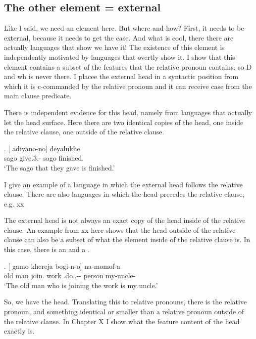 \subsection{The other element = external}\label{sec:external-element}

Like I said, we need an element here. But where and how? First, it needs to be external, because it needs to get the case. And what is cool, there there are actually languages that show we have it!
The existence of this element is independently motivated by languages that overtly show it.
I show that this element contains a subset of the features that the relative pronoun contains, so D and wh is never there.
I placee the external head in a syntactic position from which it is c-commanded by the relative pronoun and it can receive case from the main clause predicate.


There is independent evidence for this head, namely from languages that actually let the head surface. Here there are two identical copies of the head, one inside the relative clause, one outside of the relative clause.

\exg. [ adiyano-no]  deyalukhe\\
 sago give.3.- sago finished.\\
 `The sago that they gave is finished.' 

I give an example of a language in which the external head follows the relative clause. There are also languages in which the head precedes the relative clause, e.g. xx

The external head is not always an exact copy of the head inside of the relative clause. An example from xx here shows that the head outside of the relative clause can also be a subset of what the element inside of the relative clause is. In this case, there is an  and a .

\exg. [ gamo khereja bogi-n-o]  na-momof-a\\
 {old man} join. work .do..-- person my-uncle-\\
 `The old man who is joining the work is my uncle.'

So, we have the head. Translating this to relative pronouns, there is the relative pronoun, and something identical or smaller than a relative pronoun outside of the relative clause. In Chapter X I show what the feature content of the head exactly is.

